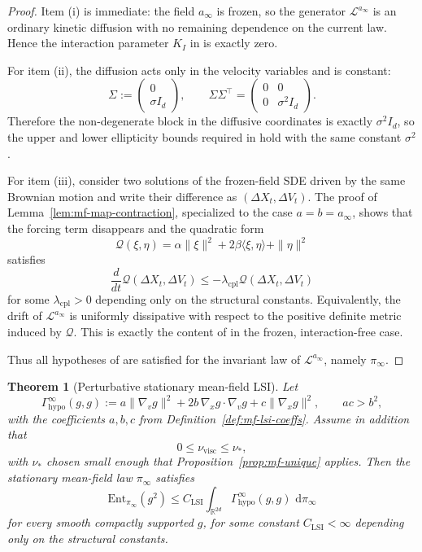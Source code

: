\documentclass[11pt]{article}
\newtheorem{theorem}{Theorem}[section]
\theoremstyle{definition}
\theoremstyle{remark}
\newcommand{\R}{\mathbb{R}}
\newcommand{\Ent}{\mathrm{Ent}}
\newcommand{\dd}{\,\mathrm{d}}
\begin{document}
\begin{proof}
Item \textnormal{(i)} is immediate: the field \(a_\infty\) is frozen, so the
generator \(\mathcal L^{a_\infty}\) is an ordinary kinetic diffusion with no
remaining dependence on the current law. Hence the interaction parameter
\(K_I\) in \cite{huang2026logsobolev} is exactly zero.

For item \textnormal{(ii)}, the diffusion acts only in the velocity variables
and is constant:
\[
\Sigma
:=
\begin{pmatrix}
0\\
\sigma I_d
\end{pmatrix},
\qquad
\Sigma\Sigma^\top
=
\begin{pmatrix}
0 & 0\\
0 & \sigma^2 I_d
\end{pmatrix}.
\]
Therefore the non-degenerate block in the diffusive coordinates is exactly
\(\sigma^2 I_d\), so the upper and lower ellipticity bounds required in
\cite[(57), (63)]{huang2026logsobolev} hold with the same constant
\(\sigma^2\).

For item \textnormal{(iii)}, consider two solutions of the frozen-field SDE
driven by the same Brownian motion and write their difference as
\((\Delta X_t,\Delta V_t)\). The proof of
Lemma~\ref{lem:mf-map-contraction}, specialized to the case \(a=b=a_\infty\),
shows that the forcing term disappears and the quadratic form
\[
\mathscr Q(\xi,\eta)=\alpha\|\xi\|^2+2\beta\langle \xi,\eta\rangle+\|\eta\|^2
\]
satisfies
\[
\frac{d}{dt}\mathscr Q(\Delta X_t,\Delta V_t)
\le
-\lambda_{\mathrm{cpl}}\mathscr Q(\Delta X_t,\Delta V_t)
\]
for some \(\lambda_{\mathrm{cpl}}>0\) depending only on the structural
constants. Equivalently, the drift of \(\mathcal L^{a_\infty}\) is uniformly
dissipative with respect to the positive definite metric induced by
\(\mathscr Q\). This is exactly the content of
\cite[(C) with \(R=0\)]{huang2026logsobolev} in the frozen, interaction-free
case.

Thus all hypotheses of \cite[Theorem~3.5]{huang2026logsobolev} are satisfied
for the invariant law of \(\mathcal L^{a_\infty}\), namely \(\pi_\infty\).
\end{proof}

\begin{theorem}[Perturbative stationary mean-field LSI]\label{thm:mf-lsi}
Let
\[
\Gamma_{\mathrm{hypo}}^\infty(g,g)
:=
a\|\nabla_v g\|^2
+2b\,\nabla_x g\cdot\nabla_v g
+c\|\nabla_x g\|^2,
\qquad
ac>b^2,
\]
with the coefficients \(a,b,c\) from
Definition~\ref{def:mf-lsi-coeffs}. Assume in addition that
\[
0\leq \nu_{\mathrm{visc}}\leq \nu_*,
\]
with \(\nu_*\) chosen small enough that Proposition~\ref{prop:mf-unique}
applies. Then the stationary mean-field law \(\pi_\infty\) satisfies
\[
\Ent_{\pi_\infty}(g^2)
\leq
C_{\mathrm{LSI}}
\int_{\R^{2d}} \Gamma_{\mathrm{hypo}}^\infty(g,g)\,\dd\pi_\infty
\]
for every smooth compactly supported \(g\), for some constant
\(C_{\mathrm{LSI}}<\infty\) depending only on the structural constants.
\end{theorem}
\end{document}
